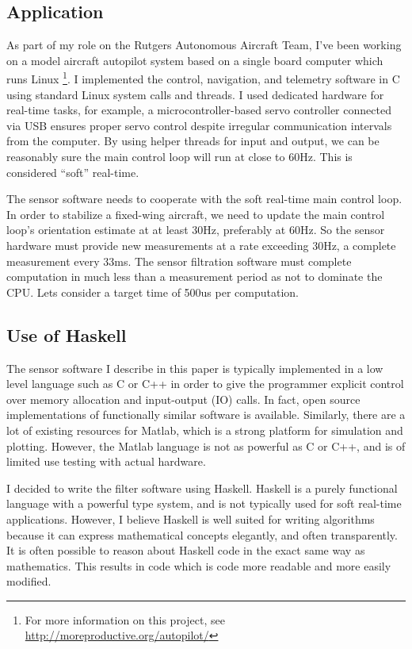 \documentclass[12pt]{report}
\begin{document}
\subsection{Application}

As part of my role on the Rutgers Autonomous Aircraft Team, I've been working on a model aircraft autopilot system based on a single board computer which runs Linux \footnote{For more information on this project, see \url{http://moreproductive.org/autopilot/}}. I implemented the control, navigation, and telemetry software in C using standard Linux system calls and threads. I used dedicated hardware for real-time tasks, for example, a microcontroller-based servo controller connected via USB ensures proper servo control despite irregular communication intervals from the computer. 
By using helper threads for input and output, we can be reasonably sure the main control loop will run at close to 60Hz. This is considered ``soft'' real-time.

The sensor software needs to cooperate with the soft real-time main control loop. In order to stabilize a fixed-wing aircraft, we need to update the main control loop's orientation estimate at at least 30Hz, preferably at 60Hz. So the sensor hardware must provide new measurements at a rate exceeding 30Hz, a complete measurement every 33ms. The sensor filtration software must complete computation in much less than a measurement period as not to dominate the CPU. Lets consider a target time of 500us per computation.

\subsection{Use of Haskell}

The sensor software I describe in this paper is typically implemented in a low level language such as C or C++ in order to give the programmer explicit control over memory allocation and input-output (IO) calls. In fact, open source implementations of functionally similar software is available. Similarly, there are a lot of existing resources for Matlab, which is a strong platform for simulation and plotting. However, the Matlab language is not as powerful as C or C++, and is of limited use testing with actual hardware. 

I decided to write the filter software using Haskell. Haskell is a purely functional language with a powerful type system, and is not typically used for soft real-time applications. However, I believe Haskell is well suited for writing algorithms because it can express mathematical concepts elegantly, and often transparently. It is often possible to reason about Haskell code in the exact same way as mathematics. This results in code which is code more readable and more easily modified. 
\end{document}
